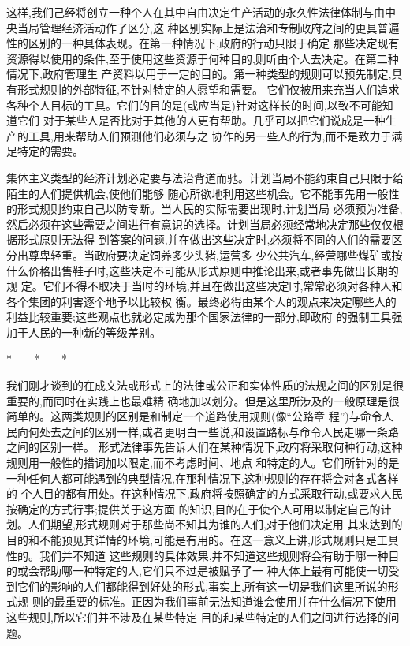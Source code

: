 ﻿\documentclass[12pt]{article}
\begin{document}
这样,我们己经将创立一种个人在其中自由决定生产活动的永久性法律体制与由中央当局管理经济活动作了区分,这
种区别实际上是法治和专制政府之间的更具普遍性的区别的一种具体表现。在第一种情况下,政府的行动只限于确定
那些决定现有资源得以使用的条件,至于使用这些资源于何种目的,则听由个人去决定。在第二种情况下,政府管理生
产资料以用于一定的目的。第一种类型的规则可以预先制定,具有形式规则的外部特征,不针对特定的人愿望和需要。
它们仅被用来充当人们追求各种个人目标的工具。它们的目的是(或应当是)针对这样长的时间,以致不可能知道它们
对于某些人是否比对于其他的人更有帮助。几乎可以把它们说成是一种生产的工具,用来帮助人们预测他们必须与之
协作的另一些人的行为,而不是致力于满足特定的需要。

集体主义类型的经济计划必定要与法治背道而驰。计划当局不能约束自己只限于给陌生的人们提供机会,使他们能够
随心所欲地利用这些机会。它不能事先用一般性的形式规则约束自己以防专断。当人民的实际需要出现时,计划当局
必须预为准备,然后必须在这些需要之间进行有意识的选择。计划当局必须经常地决定那些仅仅根据形式原则无法得
到答案的问题,并在做出这些决定时,必须将不同的人们的需要区分出尊卑轻重。当政府要决定饲养多少头猪,运营多
少公共汽车,经营哪些煤矿或按什么价格出售鞋子时,这些决定不可能从形式原则中推论出来,或者事先做出长期的规
定。它们不得不取决于当时的环境,并且在做出这些决定时,常常必须对各种人和各个集团的利害逐个地予以比较权
衡。最终必得由某个人的观点来决定哪些人的利益比较重要;这些观点也就必定成为那个国家法律的一部分,即政府
的强制工具强加于人民的一种新的等级差别。

*　　*　　*

我们刚才谈到的在成文法或形式上的法律或公正和实体性质的法规之间的区别是很重要的,而同时在实践上也最难精
确地加以划分。但是这里所涉及的一般原理是很简单的。这两类规则的区别是和制定一个道路使用规则(像``公路章
程'')与命令人民向何处去之间的区别一样,或者更明白一些说,和设置路标与命令人民走哪一条路之间的区别一样。
形式法律事先告诉人们在某种情况下,政府将采取何种行动,这种规则用一般性的措词加以限定,而不考虑时间、地点
和特定的人。它们所针对的是一种任何人都可能遇到的典型情况,在那种情况下,这种规则的存在将会对各式各样的
个人目的都有用处。在这种情况下,政府将按照确定的方式采取行动,或要求人民按确定的方式行事;提供关于这方面
的知识,目的在于使个人可用以制定自己的计划。人们期望,形式规则对于那些尚不知其为谁的人们,对于他们决定用
其来达到的目的和不能预见其详情的环境,可能是有用的。在这一意义上讲,形式规则只是工具性的。我们并不知道
这些规则的具体效果,并不知道这些规则将会有助于哪一种目的或会帮助哪一种特定的人,它们只不过是被赋予了一
种大体上最有可能使一切受到它们的影响的人们都能得到好处的形式,事实上,所有这一切是我们这里所说的形式规
则的最重要的标准。正因为我们事前无法知道谁会使用并在什么情况下使用这些规则,所以它们并不涉及在某些特定
目的和某些特定的人们之间进行选择的问题。
\end{document}
